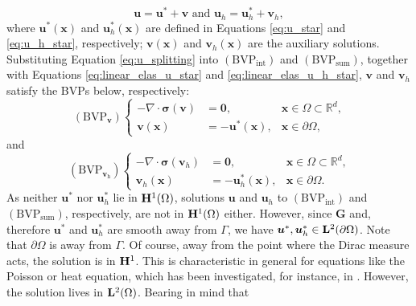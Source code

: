 \documentclass[pdflatex,sn-mathphys-num]{sn-jnl}
\newtheorem*{lemma star}{Lemma}
\begin{document}
\begin{equation}
\label{eq:u_splitting}
    {\boldsymbol u} = {\boldsymbol u}^* + {\boldsymbol v} \text{ and }
{\boldsymbol u}_h = {\boldsymbol u}_h^* + {\boldsymbol v}_h,
\end{equation}
where $\boldsymbol{u}^*(\boldsymbol x)$ and $\boldsymbol{u}_h^*(\boldsymbol x)$ are defined in Equations \eqref{eq:u_star} and \eqref{eq:u_h_star}, respectively; $\boldsymbol{v}(\boldsymbol x)$ and $\boldsymbol{v}_h(\boldsymbol x)$ are the auxiliary solutions. Substituting Equation \eqref{eq:u_splitting} into $\mathrm{(BVP_{int})}$ and $\mathrm{(BVP_{sum})}$, together with Equations \eqref{eq:linear_elas_u_star} and \eqref{eq:linear_elas_u_h_star}, $\boldsymbol{v}$ and $\boldsymbol{v}_h$ satisfy the BVPs below, respectively:
\begin{equation*}
    \mathrm{(BVP_{\boldsymbol v})}\left\{
        \begin{aligned}
            -\nabla\cdot\boldsymbol\sigma(\boldsymbol{v}) &= \boldsymbol{0}, &\mbox{$\boldsymbol{x}\in\Omega\subset\mathbb{R}^d$,}\\
            \boldsymbol{v}(\boldsymbol{x}) &= -\boldsymbol{u}^*(\boldsymbol{x}), &\mbox{$\boldsymbol{x}\in\partial\Omega$},
        \end{aligned}
    \right.
\end{equation*}
and
\begin{equation*}
    \mathrm{(BVP_{{\boldsymbol v}_h})}\left\{
        \begin{aligned}
            -\nabla\cdot\boldsymbol\sigma(\boldsymbol{v}_h) &= \boldsymbol{0}, &\mbox{$\boldsymbol{x}\in\Omega\subset\mathbb{R}^d$,}\\
            \boldsymbol{v}_h(\boldsymbol{x}) &= -\boldsymbol{u}_h^*(\boldsymbol{x}), &\mbox{$\boldsymbol{x}\in\partial\Omega$}.
        \end{aligned}
    \right.
\end{equation*}
As neither $\boldsymbol{u}^*$ nor $\boldsymbol{u}^*_h$ lie in ${\bf H}^1(\Omega)$, solutions $\boldsymbol{u}$ and $\boldsymbol{u}_h$ to $\mathrm{(BVP_{int})}$ and $\mathrm{(BVP_{sum})}$, respectively, are not in ${\bf H}^1(\Omega)$ either. However, since $\boldsymbol{G}$ and, therefore $\boldsymbol{u}^*$ and $\boldsymbol{u}_h^*$ are smooth away from $\Gamma$, we have $\boldsymbol{u}^*, \boldsymbol{u}_h^* \in {\bf L}^2(\partial \Omega)$. Note that $\partial \Omega$ is away from $\Gamma$. Of course, away from the point where the Dirac measure acts, the solution is in ${\bf H}^1$.
This is characteristic in general for equations like the Poisson or heat equation, which has been investigated, for instance, in \citep{Peng_2022_JCAM, HMEvers2015, Yang2025, Boon_2023}.  However, the solution lives in ${\bf L}^2(\Omega)$. Bearing in mind that
\end{document}
